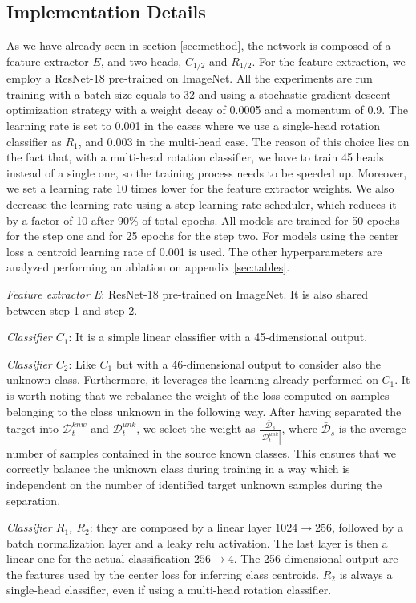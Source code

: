 \documentclass[10pt,twocolumn,letterpaper]{article}
\begin{document}
\subsection{Implementation Details}
\label{sec:implementation_details}

As we have already seen in section \ref{sec:method}, the network is composed of a feature extractor $E$, and two heads, $C_{1/2}$ and $R_{1/2}$.
For the feature extraction, we employ a ResNet-18\cite{ResNet18} pre-trained on ImageNet.
All the experiments are run training with a batch size equals to 32 and using a stochastic gradient descent optimization strategy
with a weight decay of 0.0005 and a momentum of 0.9.
The learning rate is set to 0.001 in the cases where we use a single-head rotation classifier as $R_1$, and 0.003 in the multi-head case.
The reason of this choice lies on the fact that, with a multi-head rotation classifier, we have to train 45 heads instead of a single one,
so the training process needs to be speeded up.
Moreover, we set a learning rate 10 times lower for the feature extractor weights.
We also decrease the learning rate using a step learning rate scheduler, which reduces it by a factor of 10 after 90\% of total epochs.
All models are trained for 50 epochs for the step one and for 25 epochs for the step two.
For models using the center loss a centroid learning rate of 0.001 is used.
The other hyperparameters are analyzed performing an ablation on appendix \ref{sec:tables}.

{\it Feature extractor E}: ResNet-18 pre-trained on ImageNet. It is also shared between step 1 and step 2.

{\it Classifier $C_1$}:
It is a simple linear classifier with a 45-dimensional output.

{\it Classifier $C_2$}:
Like $C_1$ but with a 46-dimensional output to consider also the unknown class. Furthermore, it leverages the learning already performed on $C_1$.
It is worth noting that we rebalance the weight of the loss computed on samples belonging to the class unknown in the following way.
After having separated the target into $\mathcal{D}_t^{knw}$ and $\mathcal{D}_t^{unk}$,
we select the weight as $\frac{\mathcal{\bar{D}}_s}{|\mathcal{D}_t^{unk}|}$,
where ${\mathcal{\bar{D}}_s}$ is the average number of samples contained in the source known classes.
This ensures that we correctly balance the unknown class during training in a way which is independent
on the number of identified target unknown samples during the separation.

{\it Classifier $R_1$, $R_2$}: 
they are composed by a linear layer $1024\to 256$, followed by a batch normalization layer and a leaky relu activation.
The last layer is then a linear one for the actual classification $256\to 4$.
The 256-dimensional output are the features used by the center loss for inferring class centroids.
$R_2$ is always a single-head classifier, even if using a multi-head rotation classifier.
\end{document}
